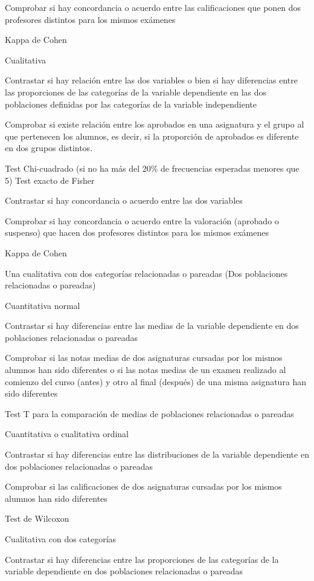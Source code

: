 \documentclass[
  a4paper,
]{scrreport}
\theoremstyle{definition}
\theoremstyle{definition}
\theoremstyle{remark}
\begin{document}
Comprobar si hay concordancia o acuerdo entre las calificaciones que
ponen dos profesores distintos para los mismos exámenes

Kappa de Cohen

Cualitativa

Contrastar si hay relación entre las dos variables o bien si hay
diferencias entre las proporciones de las categorías de la variable
dependiente en las dos poblaciones definidas por las categorías de la
variable independiente

Comprobar si existe relación entre los aprobados en una asignatura y el
grupo al que pertenecen los alumnos, es decir, si la proporción de
aprobados es diferente en dos grupos distintos.

Test Chi-cuadrado (si no ha más del 20\% de frecuencias esperadas
menores que 5) Test exacto de Fisher

Contrastar si hay concordancia o acuerdo entre las dos variables

Comprobar si hay concordancia o acuerdo entre la valoración (aprobado o
suspenso) que hacen dos profesores distintos para los mismos exámenes

Kappa de Cohen

Una cualitativa con dos categorías relacionadas o pareadas (Dos
poblaciones relacionadas o pareadas)

Cuantitativa normal

Contrastar si hay diferencias entre las medias de la variable
dependiente en dos poblaciones relacionadas o pareadas

Comprobar si las notas medias de dos asignaturas cursadas por los mismos
alumnos han sido diferentes o si las notas medias de un examen realizado
al comienzo del curso (antes) y otro al final (después) de una misma
asignatura han sido diferentes

Test T para la comparación de medias de poblaciones relacionadas o
pareadas

Cuantitativa o cualitativa ordinal

Contrastar si hay diferencias entre las distribuciones de la variable
dependiente en dos poblaciones relacionadas o pareadas

Comprobar si las calificaciones de dos asignaturas cursadas por los
mismos alumnos han sido diferentes

Test de Wilcoxon

Cualitativa con dos categorías

Contrastar si hay diferencias entre las proporciones de las categorías
de la variable dependiente en dos poblaciones relacionadas o pareadas
\end{document}
